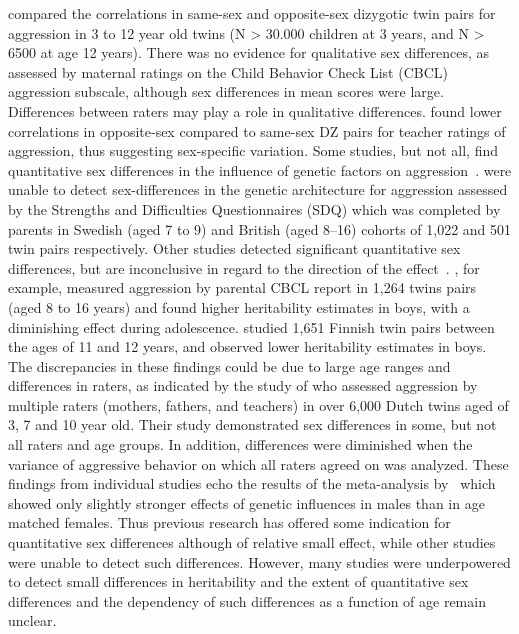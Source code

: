 \citet{Vink2012} compared the correlations in same-sex and opposite-sex dizygotic twin pairs for aggression in 3 to 12 year old twins (N > 30.000 children at 3 years, and N > 6500 at age 12 years).
There was no evidence for qualitative sex differences, as assessed by maternal ratings on the Child Behavior Check List (CBCL) aggression subscale, although sex differences in mean scores were large.
Differences between raters may play a role in qualitative differences.
\citet{Vierikko2003} found lower correlations in opposite-sex compared to same-sex DZ pairs for teacher ratings of aggression, thus suggesting sex-specific variation.  
Some studies, but not all, find quantitative sex differences in the influence of genetic factors on aggression~\cite{Cadoret1995, Eley1999, Rhee2002}.
\citet{Eley1999} were unable to detect sex-differences in the genetic architecture for aggression assessed by the Strengths and Difficulties Questionnaires (SDQ) which was completed by parents in Swedish (aged 7 to 9) and British (aged 8--16) cohorts of 1,022 and 501 twin pairs respectively.
Other studies detected significant quantitative sex differences, but are inconclusive in regard to the direction of the effect~\cite{Silberg1994, Miles1997, Vierikko2003, vanBeijsterveldt2003}.
\citet{Silberg1994}, for example, measured aggression by parental CBCL report in 1,264 twins pairs (aged 8 to 16 years) and found higher heritability estimates in boys, with a diminishing effect during adolescence.
\citet{Vierikko2003} studied 1,651 Finnish twin pairs between the ages of 11 and 12 years, and observed lower heritability estimates in boys.
The discrepancies in these findings could be due to large age ranges and differences in raters, as indicated by the study of \citet{Hudziak2003} who assessed aggression by multiple raters (mothers, fathers, and teachers) in over 6,000 Dutch twins aged of 3, 7 and 10 year old.
Their study demonstrated sex differences in some, but not all raters and age groups.
In addition, differences were diminished when the variance of aggressive behavior on which all raters agreed on was analyzed.
These findings from individual studies echo the results of the meta-analysis by~\citet{Miles1997} which showed only slightly stronger effects of genetic influences in males than in age matched females.
Thus previous research has offered some indication for quantitative sex differences although of relative small effect, while other studies were unable to detect such differences.
However, many studies were underpowered to detect small differences in heritability and the extent of quantitative sex differences and the dependency of such differences as a function of age remain unclear.  
